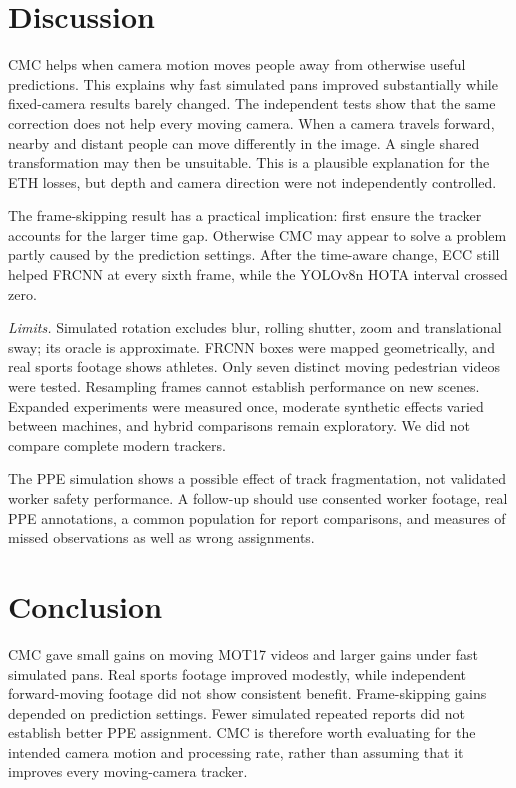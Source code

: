 \documentclass[conference]{IEEEtran}
\begin{document}
\section{Discussion}
CMC helps when camera motion moves people away from otherwise useful predictions. This explains why fast simulated pans improved substantially while fixed-camera results barely changed. The independent tests show that the same correction does not help every moving camera. When a camera travels forward, nearby and distant people can move differently in the image. A single shared transformation may then be unsuitable. This is a plausible explanation for the ETH losses, but depth and camera direction were not independently controlled.

The frame-skipping result has a practical implication: first ensure the tracker accounts for the larger time gap. Otherwise CMC may appear to solve a problem partly caused by the prediction settings. After the time-aware change, ECC still helped FRCNN at every sixth frame, while the YOLOv8n HOTA interval crossed zero.

\emph{Limits.} Simulated rotation excludes blur, rolling shutter, zoom and translational sway; its oracle is approximate. FRCNN boxes were mapped geometrically, and real sports footage shows athletes. Only seven distinct moving pedestrian videos were tested. Resampling frames cannot establish performance on new scenes. Expanded experiments were measured once, moderate synthetic effects varied between machines, and hybrid comparisons remain exploratory. We did not compare complete modern trackers.

The PPE simulation shows a possible effect of track fragmentation, not validated worker safety performance. A follow-up should use consented worker footage, real PPE annotations, a common population for report comparisons, and measures of missed observations as well as wrong assignments.

\section{Conclusion}
CMC gave small gains on moving MOT17 videos and larger gains under fast simulated pans. Real sports footage improved modestly, while independent forward-moving footage did not show consistent benefit. Frame-skipping gains depended on prediction settings. Fewer simulated repeated reports did not establish better PPE assignment. CMC is therefore worth evaluating for the intended camera motion and processing rate, rather than assuming that it improves every moving-camera tracker.
\end{document}
